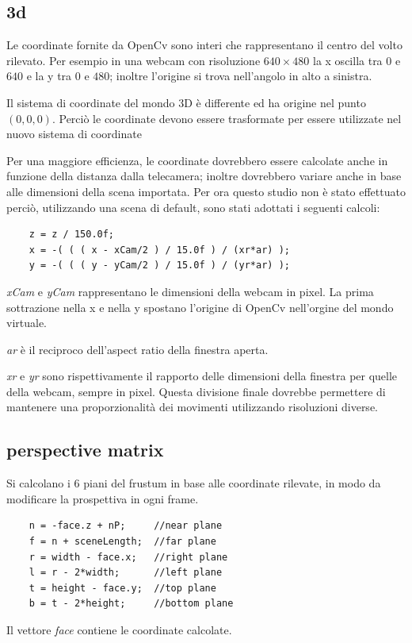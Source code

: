 \subsection{3d}
Le coordinate fornite da OpenCv sono interi che rappresentano il centro del volto rilevato.
Per esempio in una webcam con risoluzione $640\times 480$ la x oscilla tra $0$ e $640$ e la y tra $0$ e $480$; inoltre l'origine si trova nell'angolo in alto a sinistra.

Il sistema di coordinate del mondo 3D è differente ed ha origine nel punto $(0,0,0)$. Perciò le coordinate devono essere trasformate per essere utilizzate nel nuovo sistema di coordinate

Per una maggiore efficienza, le coordinate dovrebbero essere calcolate anche in funzione della distanza dalla telecamera; inoltre dovrebbero variare anche in base alle dimensioni della scena importata. Per ora questo studio non è stato effettuato perciò, utilizzando una scena di default, sono stati adottati i seguenti calcoli:
\begin{lstlisting}
    z = z / 150.0f;
    x = -( ( ( x - xCam/2 ) / 15.0f ) / (xr*ar) );
    y = -( ( ( y - yCam/2 ) / 15.0f ) / (yr*ar) );  
\end{lstlisting}  
\textit{xCam} e \textit{yCam} rappresentano le dimensioni della webcam in pixel. La prima sottrazione nella x e nella y spostano l'origine di OpenCv nell'orgine del mondo virtuale.

\textit{ar} è il reciproco dell'aspect ratio della finestra aperta.

\textit{xr} e \textit{yr} sono rispettivamente il rapporto delle dimensioni della finestra per quelle della webcam, sempre in pixel. Questa divisione finale dovrebbe permettere di mantenere una proporzionalità dei movimenti utilizzando risoluzioni diverse.

\subsection{perspective matrix}
Si calcolano i 6 piani del frustum in base alle coordinate rilevate, in modo da modificare la prospettiva in ogni frame.
\begin{lstlisting}
    n = -face.z + nP;     //near plane
    f = n + sceneLength;  //far plane
    r = width - face.x;   //right plane
    l = r - 2*width;      //left plane
    t = height - face.y;  //top plane
    b = t - 2*height;     //bottom plane

\end{lstlisting}
Il vettore \textit{face} contiene le coordinate calcolate.

